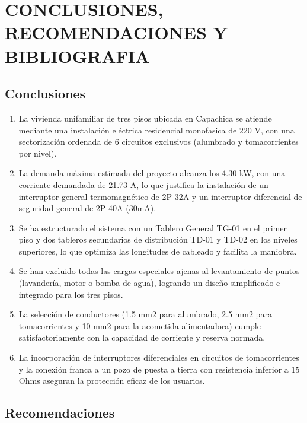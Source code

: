 \chapter{CONCLUSIONES, RECOMENDACIONES Y BIBLIOGRAFIA}

\section{Conclusiones}

\begin{enumerate}
  \item La vivienda unifamiliar de tres pisos ubicada en Capachica se atiende mediante una instalación eléctrica residencial monofasica de 220 V, con una sectorización ordenada de 6 circuitos exclusivos (alumbrado y tomacorrientes por nivel).
  \item La demanda máxima estimada del proyecto alcanza los 4.30 kW, con una corriente demandada de 21.73 A, lo que justifica la instalación de un interruptor general termomagnético de 2P-32A y un interruptor diferencial de seguridad general de 2P-40A (30mA).
  \item Se ha estructurado el sistema con un Tablero General TG-01 en el primer piso y dos tableros secundarios de distribución TD-01 y TD-02 en los niveles superiores, lo que optimiza las longitudes de cableado y facilita la maniobra.
  \item Se han excluido todas las cargas especiales ajenas al levantamiento de puntos (lavandería, motor o bomba de agua), logrando un diseño simplificado e integrado para los tres pisos.
  \item La selección de conductores (1.5 mm2 para alumbrado, 2.5 mm2 para tomacorrientes y 10 mm2 para la acometida alimentadora) cumple satisfactoriamente con la capacidad de corriente y reserva normada.
  \item La incorporación de interruptores diferenciales en circuitos de tomacorrientes y la conexión franca a un pozo de puesta a tierra con resistencia inferior a 15 Ohms aseguran la protección eficaz de los usuarios.
\end{enumerate}

\section{Recomendaciones}

